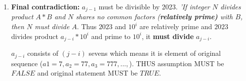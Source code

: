 \documentclass[../Main.tex]{subfiles}
\begin{document}
{\begin{enumerate}
    $a_j-a_i=a_{j-i} * 10^i$
    \item{\textbf{Final contradiction:}} $a_{j-1}$ must be divisible by 2023. \textit{'If integer $N$ divides product $A*B$ and $N$ shares no common factors (\textbf{relatively prime)} with $B$, then $N$ must divide $A$}. Thus $2023$ and $10^i$ are relatively prime and $2023$ divides product $a_{j-i} * 10^i$ and prime to $10^i$, it \textbf{must divide} $a_{j-i}$.

    $a_{j-i}$ consists of $(j-i)$ sevens which means it is element of original sequence ($a1=7, a_2=77, a_3=777,...,$). THUS assumption MUST be $FALSE$ and original statement MUST be $TRUE$. 
\end{enumerate}

}
\end{document}
